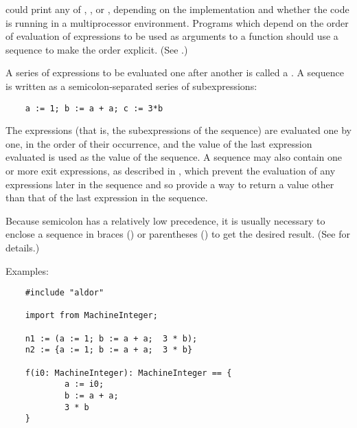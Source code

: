 could print any of , ,  or ,
depending on the implementation and whether the code is running in a
multiprocessor environment.
Programs which depend on the order of evaluation of expressions to
be used as arguments to a function should use a sequence to make
the order explicit.  (See .)


A series of expressions to be evaluated one after another is called a
.  A sequence is written as a
semicolon-separated series of subexpressions:

\begin{small}
\begin{verbatim}
    a := 1; b := a + a; c := 3*b
\end{verbatim}
\end{small}

The expressions (that is, the subexpressions of the sequence)
are evaluated one by one, in the order of their
occurrence, and the value of the last expression evaluated
is used as the value of the sequence.  A sequence may also
contain one or more exit expressions, as described in
, which prevent the evaluation of any
expressions later in the sequence and so provide a way to return
a value other than that of the last expression in the sequence.

Because semicolon has a relatively low precedence,
it is usually necessary to enclose a sequence in braces (\ttin{\{ \}})
or parentheses (\ttin{( )}) to get the desired result.
(See  for details.)

Examples:

\begin{small}
\begin{verbatim}
    #include "aldor"

    import from MachineInteger;

    n1 := (a := 1; b := a + a;  3 * b);
    n2 := {a := 1; b := a + a;  3 * b}

    f(i0: MachineInteger): MachineInteger == {
            a := i0;
            b := a + a;
            3 * b
    }
\end{verbatim}
\end{small}
    
